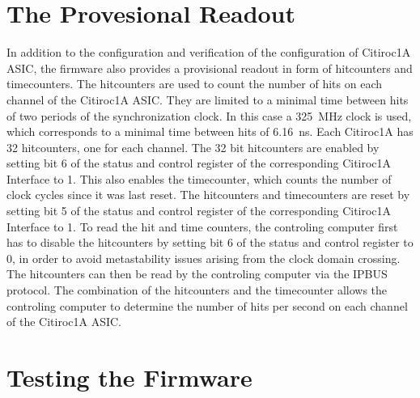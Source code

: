 \section{The Provesional Readout}
In addition to the configuration and verification of the configuration of Citiroc1A ASIC, the firmware also provides a provisional readout in form of hitcounters and timecounters. 
\newline
The hitcounters are used to count the number of hits on each channel of the Citiroc1A ASIC.
\newline
They are limited to a minimal time between hits of two periods of the synchronization clock.
In this case a \SI{325}{\mega\hertz} clock is used, which corresponds to a minimal time between hits of \SI{6.16}{\nano\second}.
\newline
Each Citiroc1A has 32 hitcounters, one for each channel.
The 32 bit hitcounters are enabled by setting bit 6 of the status and control register of the corresponding Citiroc1A Interface to 1. 
This also enables the timecounter, which counts the number of clock cycles since it was last reset. 
\newline
The hitcounters and timecounters are reset by setting bit 5 of the status and control register of the corresponding Citiroc1A Interface to 1.
\newline
To read the hit and time counters, the controling computer first has to disable the hitcounters by setting bit 6 of the status and control register to 0, in order to avoid metastability issues arising from the clock domain crossing.
The hitcounters can then be read by the controling computer via the IPBUS protocol.
\newline
The combination of the hitcounters and the timecounter allows the controling computer to determine the number of hits per second on each channel of the Citiroc1A ASIC. 


\section{Testing the Firmware}

